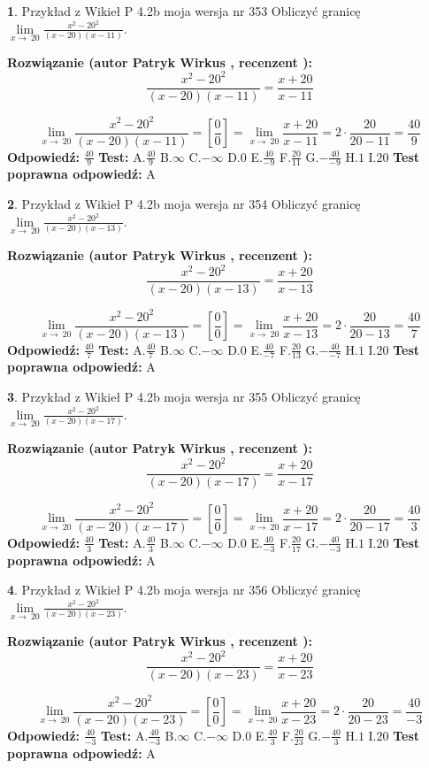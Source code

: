 \documentclass[12pt, a4paper]{article}
\theoremstyle{definition} %
\newtheorem{zad}{}
\newcommand{\zadStart}[1]{\begin{zad}#1\newline}
\newcommand{\zadStop}{\end{zad}}
\newcommand{\rozwStart}[2]{\noindent \textbf{Rozwiązanie (autor #1 , recenzent #2): }\newline}
\newcommand{\rozwStop}{\newline}
\newcommand{\odpStart}{\noindent \textbf{Odpowiedź:}\newline}
\newcommand{\odpStop}{\newline}
\newcommand{\testStart}{\noindent \textbf{Test:}\newline}
\newcommand{\testStop}{\newline}
\newcommand{\kluczStart}{\noindent \textbf{Test poprawna odpowiedź:}\newline}
\newcommand{\kluczStop}{\newline}
\begin{document}
\zadStart{Przykład z Wikieł P 4.2b moja wersja nr 353}
Obliczyć granicę $\lim\limits_{x\to\ 20}\frac{x^{2}-20^{2}}{(x-20)(x-11)}$.
\zadStop
\rozwStart{Patryk Wirkus}{}
$$\frac{x^{2}-20^{2}}{(x-20)(x-11)}=\frac{x+20}{x-11}$$

$$\lim\limits_{x\to\ 20}\frac{x^{2}-20^{2}}{(x-20)(x-11)}=[\frac{0}{0}]=\lim\limits_{x\to\ 20}\frac{x+20}{x-11}=2 \cdot \frac{20}{20-11} = \frac{40}{9}$$
\rozwStop
\odpStart
$\frac{40}{9}$
\odpStop
\testStart
A.$\frac{40}{9}$
B.$\infty$
C.$-\infty$
D.$0$
E.$\frac{40}{-9}$
F.$\frac{20}{11}$
G.$-\frac{40}{-9}$
H.$1$
I.$20$
\testStop
\kluczStart
A
\kluczStop



\zadStart{Przykład z Wikieł P 4.2b moja wersja nr 354}
Obliczyć granicę $\lim\limits_{x\to\ 20}\frac{x^{2}-20^{2}}{(x-20)(x-13)}$.
\zadStop
\rozwStart{Patryk Wirkus}{}
$$\frac{x^{2}-20^{2}}{(x-20)(x-13)}=\frac{x+20}{x-13}$$

$$\lim\limits_{x\to\ 20}\frac{x^{2}-20^{2}}{(x-20)(x-13)}=[\frac{0}{0}]=\lim\limits_{x\to\ 20}\frac{x+20}{x-13}=2 \cdot \frac{20}{20-13} = \frac{40}{7}$$
\rozwStop
\odpStart
$\frac{40}{7}$
\odpStop
\testStart
A.$\frac{40}{7}$
B.$\infty$
C.$-\infty$
D.$0$
E.$\frac{40}{-7}$
F.$\frac{20}{13}$
G.$-\frac{40}{-7}$
H.$1$
I.$20$
\testStop
\kluczStart
A
\kluczStop



\zadStart{Przykład z Wikieł P 4.2b moja wersja nr 355}
Obliczyć granicę $\lim\limits_{x\to\ 20}\frac{x^{2}-20^{2}}{(x-20)(x-17)}$.
\zadStop
\rozwStart{Patryk Wirkus}{}
$$\frac{x^{2}-20^{2}}{(x-20)(x-17)}=\frac{x+20}{x-17}$$

$$\lim\limits_{x\to\ 20}\frac{x^{2}-20^{2}}{(x-20)(x-17)}=[\frac{0}{0}]=\lim\limits_{x\to\ 20}\frac{x+20}{x-17}=2 \cdot \frac{20}{20-17} = \frac{40}{3}$$
\rozwStop
\odpStart
$\frac{40}{3}$
\odpStop
\testStart
A.$\frac{40}{3}$
B.$\infty$
C.$-\infty$
D.$0$
E.$\frac{40}{-3}$
F.$\frac{20}{17}$
G.$-\frac{40}{-3}$
H.$1$
I.$20$
\testStop
\kluczStart
A
\kluczStop



\zadStart{Przykład z Wikieł P 4.2b moja wersja nr 356}
Obliczyć granicę $\lim\limits_{x\to\ 20}\frac{x^{2}-20^{2}}{(x-20)(x-23)}$.
\zadStop
\rozwStart{Patryk Wirkus}{}
$$\frac{x^{2}-20^{2}}{(x-20)(x-23)}=\frac{x+20}{x-23}$$

$$\lim\limits_{x\to\ 20}\frac{x^{2}-20^{2}}{(x-20)(x-23)}=[\frac{0}{0}]=\lim\limits_{x\to\ 20}\frac{x+20}{x-23}=2 \cdot \frac{20}{20-23} = \frac{40}{-3}$$
\rozwStop
\odpStart
$\frac{40}{-3}$
\odpStop
\testStart
A.$\frac{40}{-3}$
B.$\infty$
C.$-\infty$
D.$0$
E.$\frac{40}{3}$
F.$\frac{20}{23}$
G.$-\frac{40}{3}$
H.$1$
I.$20$
\testStop
\kluczStart
A
\kluczStop
\end{document}
